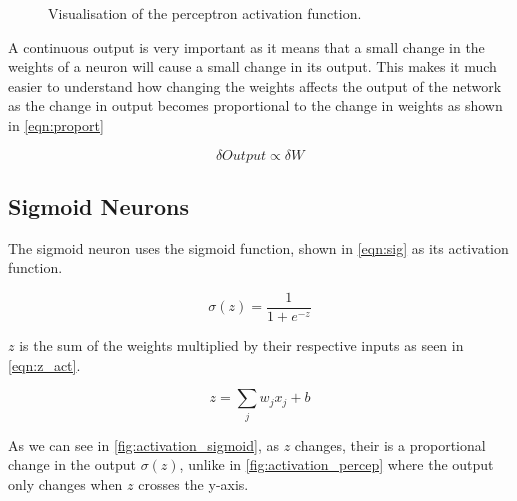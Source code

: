 \begin{figure}
\begin{center}
\caption{Visualisation of the perceptron activation function.}
\label{fig:activation_percep}
\end{center}
\end{figure}

A continuous output is very important as it means that a small change in the weights of a neuron will cause a small change in its output. This makes it much easier to understand how changing the weights affects the output of the network as the change in output becomes proportional to the change in weights as shown in \autoref{eqn:proport}

\begin{equation}
	\delta Output \propto \delta W
	\label{eqn:proport}
\end{equation}  


\subsection{Sigmoid Neurons}

The sigmoid neuron uses the sigmoid function, shown in \autoref{eqn:sig} as its activation function. 

\begin{equation}
\sigma(z) = \frac{1}{1 + e^{-z}}
\label{eqn:sig}
\end{equation}

$z$ is the sum of the weights multiplied by their respective inputs as seen in  \autoref{eqn:z_act}.

\begin{equation}
z = \sum_{j} w_j x_j + b
\label{eqn:z_act}
\end{equation}

As we can see in \autoref{fig:activation_sigmoid}, as $z$ changes, their is a proportional change in the output $\sigma(z)$, unlike in \autoref{fig:activation_percep} where the output only changes when $z$ crosses the y-axis.

